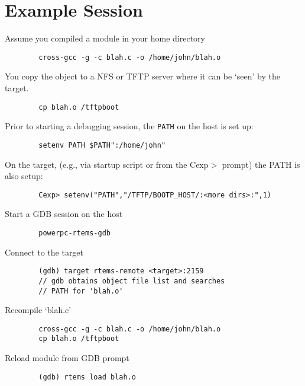 \documentclass{article}
\begin{document}
\section{Example Session}
	Assume you compiled a module in your home directory
\begin{verbatim}
		cross-gcc -g -c blah.c -o /home/john/blah.o
\end{verbatim}
    You copy the object to a NFS or TFTP server where it can be
	`seen' by the target.
\begin{verbatim}
		cp blah.o /tftpboot
\end{verbatim}
	Prior to starting a debugging session, the {\tt PATH} on the
	host is set up:
\begin{verbatim}
		setenv PATH $PATH":/home/john"
\end{verbatim}
	On the target, (e.g., via startup script or from the Cexp$>$
	prompt) the PATH is also setup:
\begin{verbatim}
		Cexp> setenv("PATH","/TFTP/BOOTP_HOST/:<more dirs>:",1)
\end{verbatim}
	Start a GDB session on the host
\begin{verbatim}
		powerpc-rtems-gdb
\end{verbatim}
	Connect to the target
\begin{verbatim}
		(gdb) target rtems-remote <target>:2159
		// gdb obtains object file list and searches
        // PATH for 'blah.o'
\end{verbatim}
	Recompile `blah.c'
\begin{verbatim}
		cross-gcc -g -c blah.c -o /home/john/blah.o
		cp blah.o /tftpboot
\end{verbatim}
	Reload module from GDB prompt
\begin{verbatim}
		(gdb) rtems load blah.o
\end{verbatim}
\end{document}
